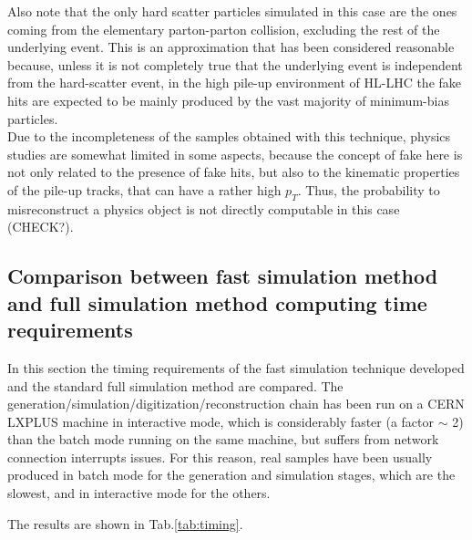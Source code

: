 \documentclass[a4paper,twoside,12pt]{article}
\begin{document}
Also note that the only hard scatter particles simulated in this case are the ones coming from
the elementary parton-parton collision, excluding the rest of the underlying event. This
is an approximation that has been considered reasonable because, unless it is not completely
true that the underlying event is independent from the hard-scatter event, in the high pile-up
environment of HL-LHC the fake hits are expected to be mainly produced by the vast majority of minimum-bias particles. \\

Due to the incompleteness of the samples obtained with this technique, physics studies are somewhat limited in some aspects, because the 
concept of fake here is not only related to the presence of fake hits, but also to the kinematic 
properties of the pile-up tracks, that can have a rather high $p_T$. Thus, the probability to misreconstruct a physics object
is not directly computable in this case (CHECK?).

\subsection{Comparison between fast simulation method and full simulation method computing time requirements}

In this section the timing requirements of the fast simulation technique developed and the
standard full simulation method are compared.
The generation/simulation/digitization/reconstruction chain has been run on a 
CERN LXPLUS machine in interactive mode, which is considerably faster (a factor $\sim$ 2) than the batch mode running on the same machine,
but suffers from network connection interrupts issues. For this reason, real samples have been  
usually produced in batch mode for the generation and simulation stages, which are the slowest, and in interactive
mode for the others.

The results are shown in Tab.\ref{tab:timing}.
\end{document}
